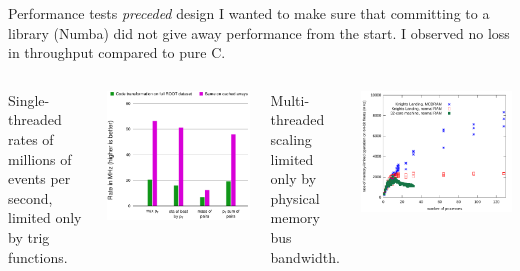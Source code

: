 \documentclass[aspectratio=169]{beamer}
\begin{document}
\begin{frame}{Performance tests {\it preceded} design}
\vspace{0.3 cm}
I wanted to make sure that committing to a library (Numba) did not give away performance from the start. I observed no loss in throughput compared to pure C.

\vspace{0.2 cm}
\begin{columns}[t]
Single-threaded rates of millions of events per second, limited only by trig functions.

\begin{center}
\includegraphics[height=5 cm]{physical-media.pdf}
\end{center}
Multi-threaded scaling limited only by physical memory bus bandwidth.

\vspace{-0.8\baselineskip}
\begin{center}
\includegraphics[height=5 cm]{knl-scaling.pdf}
\end{center}
\end{columns}
\end{frame}
\end{document}
